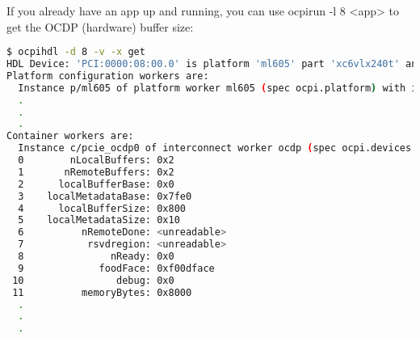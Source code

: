    If you already have an app up and running, you can use ocpirun -l 8 <app> to get the OCDP (hardware) buffer size:

\begin{lstlisting}[language=bash]
$ ocpihdl -d 8 -v -x get                                                                                              
HDL Device: 'PCI:0000:08:00.0' is platform 'ml605' part 'xc6vlx240t' and UUID 'a8a14a66-7c89-11e4-984c-a7a995a51aa1'                                 
Platform configuration workers are:                                                                                                                  
  Instance p/ml605 of platform worker ml605 (spec ocpi.platform) with index 0                                                                        
  .
  .
  .                                                                                                                                      
Container workers are:                                                                                                                                               
  Instance c/pcie_ocdp0 of interconnect worker ocdp (spec ocpi.devices.ocdp) with index 5                                                                            
  0        nLocalBuffers: 0x2                                                                                                                                        
  1       nRemoteBuffers: 0x2                                                                                                                                        
  2      localBufferBase: 0x0                                                                                                                                        
  3    localMetadataBase: 0x7fe0                                                                                                                                     
  4      localBufferSize: 0x800                                                                                                                                      
  5    localMetadataSize: 0x10                                                                                                                                       
  6          nRemoteDone: <unreadable>                                                                                                                               
  7           rsvdregion: <unreadable>                                                                                                                               
  8               nReady: 0x0                                                                                                                                        
  9             foodFace: 0xf00dface                                                                                                                                 
 10                debug: 0x0                                                                                                                                        
 11          memoryBytes: 0x8000
  .
  .
  .
\end{lstlisting}

